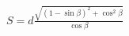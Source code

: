 \documentclass[border=2.5pt]{standalone}
\begin{document}
$\displaystyle S=d\frac{\sqrt{(1-\sin\beta)^2+\cos^2\beta}}{\cos\beta}$
\end{document}
